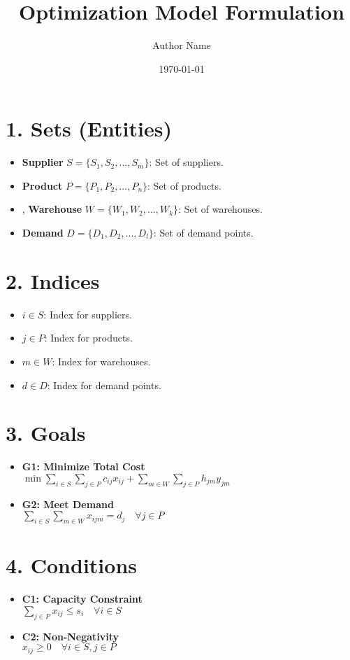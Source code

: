 \documentclass{article}
\title{Optimization Model Formulation}
\author{Author Name}
\date{\today}
\begin{document}
\maketitle
\tableofcontents
\newpage

\section{1. Sets (Entities)}
\begin{itemize}
    \item \textbf{Supplier} $ S = \{S_1, S_2, ..., S_m\} $: Set of suppliers.
    \item \textbf{Product} $ P = \{P_1, P_2, ..., P_n\} $: Set of products.
    \item \text, \textbf{Warehouse} $ W = \{W_1, W_2, ..., W_k\} $: Set of warehouses.
    \item \textbf{Demand} $ D = \{D_1, D_2, ..., D_l\} $: Set of demand points.
\end{itemize}

\section{2. Indices}
\begin{itemize}
    \item $ i \in S $: Index for suppliers.
    \item $ j \in P $: Index for products.
    \item $ m \in W $: Index for warehouses.
    \item $ d \in D $: Index for demand points.
\end{itemize}

\section{3. Goals}
\begin{itemize}
    \item \textbf{G1: Minimize Total Cost} \\
    $ \min \sum_{i \in S} \sum_{j \in P} c_{ij} x_{ij} + \sum_{m \in W} \sum_{j \in P} h_{jm} y_{jm} $
    \item \textbf{G2: Meet Demand} \\
    $ \sum_{i \in S} \sum_{m \in W} x_{ijm} = d_j \quad \forall j \in P $
\end{itemize}

\section{4. Conditions}
\begin{itemize}
    \item \textbf{C1: Capacity Constraint} \\
    $ \sum_{j \in P} x_{ij} \leq s_i \quad \forall i \in S $
    \item \textbf{C2: Non-Negativity} \\
    $ x_{ij} \geq 0 \quad \forall i \in S, j \in P $
\end{itemize}
\end{document}
